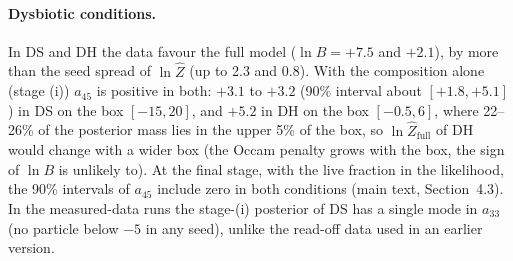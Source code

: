 \documentclass[11pt,a4paper]{article}
\begin{document}
\paragraph{Dysbiotic conditions.}
In DS and DH the data favour the full model ($\ln B=+7.5$ and $+2.1$), by more than the seed spread of $\ln\hat Z$ (up to 2.3 and 0.8).
With the composition alone (stage (i)) $a_{45}$ is positive in both: $+3.1$ to $+3.2$ (90\% interval about $[+1.8,+5.1]$) in DS on the box $[-15,20]$, and $+5.2$ in DH on the box $[-0.5,6]$, where 22--26\% of the posterior mass lies in the upper 5\% of the box, so $\ln\hat Z_{\mathrm{full}}$ of DH would change with a wider box (the Occam penalty grows with the box, the sign of $\ln B$ is unlikely to).
At the final stage, with the live fraction in the likelihood, the 90\% intervals of $a_{45}$ include zero in both conditions (main text, Section~4.3).
In the measured-data runs the stage-(i) posterior of DS has a single mode in $a_{33}$ (no particle below $-5$ in any seed), unlike the read-off data used in an earlier version.
\end{document}
